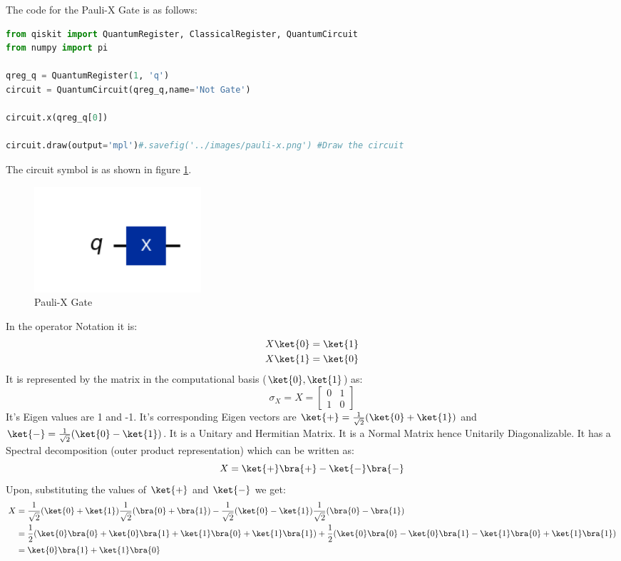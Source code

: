 \documentclass[12pt, oneside]{book}
\theoremstyle{definition}
\theoremstyle{definition}
\theoremstyle{remark}
\begin{document}
The code for the Pauli-X Gate is as follows:
\begin{lstlisting}[language=Python]
from qiskit import QuantumRegister, ClassicalRegister, QuantumCircuit
from numpy import pi

qreg_q = QuantumRegister(1, 'q')
circuit = QuantumCircuit(qreg_q,name='Not Gate')

circuit.x(qreg_q[0])

circuit.draw(output='mpl')#.savefig('../images/pauli-x.png') #Draw the circuit
\end{lstlisting}
The circuit symbol is as shown in figure \ref{fig:pauli-x}.
\begin{figure}[H]
    \centering
    \includegraphics[width=0.3\textwidth]{../images/pauli-x.png}
    \caption{Pauli-X Gate}
    \label{fig:pauli-x}
\end{figure}
In the operator Notation it is:
\begin{align*}
    X\ket{0}&=\ket{1} \\
    X\ket{1}&=\ket{0}
\end{align*}
It is represented by the matrix in the computational basis ($\ket{0},\ket{1}$) as:
\[
    \sigma_X=X=\begin{bmatrix}
        0 & 1 \\
        1 & 0
    \end{bmatrix}
\]
It's Eigen values are 1 and -1. It's corresponding Eigen vectors are $\ket{+}=\frac{1}{\sqrt{2}}(\ket{0}+\ket{1})$ and $\ket{-}=\frac{1}{\sqrt{2}}(\ket{0}-\ket{1})$.
It is a Unitary and Hermitian Matrix. It is a Normal Matrix hence Unitarily Diagonalizable.
It has a Spectral decomposition (outer product representation) which can be written as:
\[
    X=\ket{+}\bra{+}-\ket{-}\bra{-}
\]
Upon, substituting the values of $\ket{+}$ and $\ket{-}$ we get:
\begin{align*}
    X&=\dfrac{1}{\sqrt{2}}(\ket{0}+\ket{1})\dfrac{1}{\sqrt{2}}(\bra{0}+\bra{1})-\dfrac{1}{\sqrt{2}}(\ket{0}-\ket{1})\dfrac{1}{\sqrt{2}}(\bra{0}-\bra{1})\\
    &=\dfrac{1}{2}(\ket{0}\bra{0}+\ket{0}\bra{1}+\ket{1}\bra{0}+\ket{1}\bra{1})+\dfrac{1}{2}(\ket{0}\bra{0}-\ket{0}\bra{1}-\ket{1}\bra{0}+\ket{1}\bra{1})\\
    &=\ket{0}\bra{1}+\ket{1}\bra{0}
\end{align*}
\end{document}
